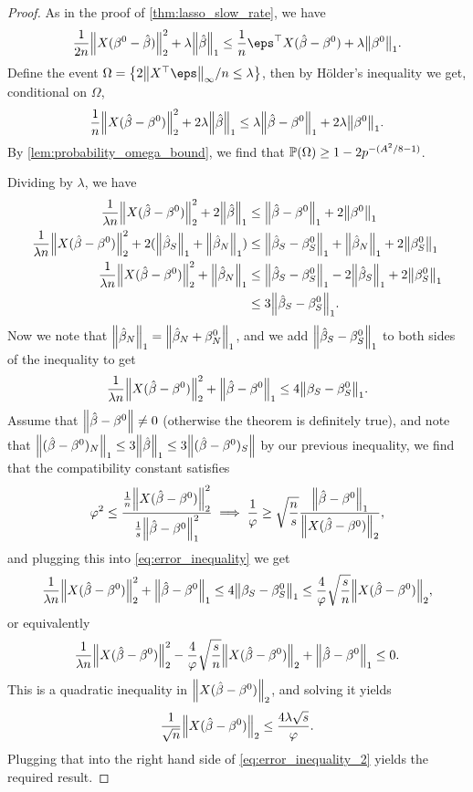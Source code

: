 \begin{proof}
	As in the proof of \cref{thm:lasso_slow_rate}, we have
	\[
	\frac1{2n} \norm{X(\beta^0 - \hat\beta)}_2^2 + \lambda \norm{\hat\beta}_1 \leq \frac1n \eps\T X(\hat\beta - \beta^0) + \lambda \norm{\beta^0}_1. 
	\]
	Define the event $\Omega = \qty{2 \norm{X\T \eps}_\infty/n \leq \lambda}$, then by H\"older's inequality we get, conditional on $\Omega$,
	\[
	\frac1n \norm{X(\hat\beta - \beta^0)}_2^2 + 2\lambda \norm{\hat\beta}_1  \leq \lambda \norm{\hat\beta - \beta^0}_1 + 2\lambda \norm{\beta^0}_1. 
	\]
	By \cref{lem:probability_omega_bound}, we find that $\mathbb P(\Omega) \geq 1 - 2p^{-(A^2/8 - 1)}$. 
	
	Dividing by $\lambda$, we have
	\begin{align*}
		\frac1{\lambda n} \norm{X(\hat\beta - \beta^0)}_2^2 + 2 \norm{\hat\beta}_1 &\leq \norm{\hat\beta - \beta^0}_1 + 2 \norm{\beta^0}_1 \\
		\frac1{\lambda n} \norm{X(\hat\beta - \beta^0)}_2^2 + 2 (\norm{\hat\beta_S}_1 + \norm{\hat\beta_N}_1) &\leq \norm{\hat\beta_S - \beta^0_S}_1 + \norm{\hat\beta_N}_1 + 2 \norm{\beta^0_S}_1\\
		\frac1{\lambda n} \norm{X(\hat\beta - \beta^0)}_2^2 +  \norm{\hat\beta_N}_1 &\leq \norm{\hat\beta_S - \beta^0_S}_1 - 2 \norm{\hat\beta_S}_1 + 2 \norm{\beta^0_S}_1 \\
		&\leq 3 \norm{\hat\beta_S - \beta^0_S}_1. 
	\end{align*}
	Now we note that $\norm{\hat\beta_N}_1 = \norm{\hat\beta_N + \beta^0_N}_1$, and we add $\norm{\hat\beta_S - \beta^0_S}_1$ to both sides of the inequality to get
	\begin{equation} \label{eq:error_inequality}
	\frac1{\lambda n} \norm{X(\hat\beta - \beta^0)}_2^2 + \norm{\hat\beta - \beta^0}_1  \leq 4 \norm{\beta_S - \beta^0_S}_1. 
	\end{equation}
	Assume that $\norm{\hat\beta - \beta^0} \neq 0$ (otherwise the theorem is definitely true), and note that $\norm{(\hat\beta - \beta^0)_N}_1 \leq 3 \norm{\hat\beta}_1 \leq 3 \norm{(\hat \beta - \beta^0)_S}$ by our previous inequality, we find that the compatibility constant satisfies
	\[
	\varphi^2 \leq \frac{\frac1n \norm{X(\hat\beta - \beta^0)}_2^2}{\frac1s \norm{\hat\beta - \beta^0}_1^2} \implies \frac1{\varphi} \geq \sqrt{\frac ns} \frac{\norm{\hat\beta - \beta^0}_1}{\norm{X(\hat\beta - \beta^0)}_2},
	\]
	and plugging this into \cref{eq:error_inequality} we get
	\begin{equation} \label{eq:error_inequality_2}
	\frac1{\lambda n} \norm{X(\hat\beta - \beta^0)}_2^2 + \norm{\hat\beta - \beta^0}_1  \leq 4 \norm{\beta_S - \beta^0_S}_1 \leq \frac4{\varphi} \sqrt{\frac sn} \norm{X(\hat\beta - \beta^0)}_2,
	\end{equation}
	or equivalently
	\[
	\frac1{\lambda n} \norm{X(\hat\beta - \beta^0)}_2^2 - \frac4{\varphi} \sqrt{\frac sn} \norm{X(\hat\beta - \beta^0)}_2 + \norm{\hat\beta - \beta^0}_1 \leq 0. 
	\]
	This is a quadratic inequality in $\norm{X(\hat\beta - \beta^0)}_2$, and solving it yields
	\[
	\frac1{\sqrt n} \norm{X(\hat\beta - \beta^0)}_2 \leq \frac{4\lambda \sqrt s}{\varphi}. 
	\] 
	Plugging that into the right hand side of \cref{eq:error_inequality_2} yields the required result. 
\end{proof}

